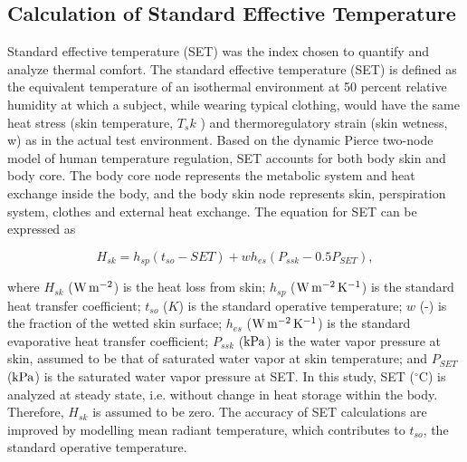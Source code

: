 \documentclass[preprint,3p,12pt,english]{elsarticle}
\begin{document}

\vspace{3ex}

\subsection{Calculation of Standard Effective Temperature}
Standard effective temperature (SET) was the index chosen to quantify and analyze thermal comfort. The standard effective temperature (SET) is defined as the equivalent temperature of an isothermal environment at 50 percent relative humidity at which a subject, while wearing typical clothing, would have the same heat stress (skin temperature, $T_sk$ ) and thermoregulatory strain (skin wetness, w) as in the actual test environment. Based on the dynamic Pierce two-node model of human temperature regulation, SET accounts for both body skin and body core. The body core node represents the metabolic system and heat exchange inside the body, and the body skin node represents skin, perspiration system, clothes and external heat exchange. The equation for SET can be expressed as \cite{gagge1986standard}

\begin{equation}
H_{sk}=h_{sp}(t_{so}-SET)+wh_{es}(P_{ssk}-0.5P_{SET}),
\label{Eqa.SET}
\end{equation}

where $H_{sk}$ ($\rm W\, m^{-2}$) is the heat loss from skin; $h_{sp}$ ($\rm W\, m^{-2}\,K^{-1}$) is the standard heat transfer coefficient; $t_{so}$ ($K$) is the standard operative temperature; $w$ (-) is the fraction of the wetted skin surface; $h_{es}$ ($\rm W\, m^{-2}\,K^{-1}$) is the standard evaporative heat transfer coefficient; $P_{ssk}$ ($\rm kPa$) is the water vapor pressure at skin, assumed to be that of saturated water vapor at skin temperature; and $P_{SET}$ ($\rm kPa$) is the saturated water vapor pressure at SET. In this study, SET ($^{\circ}$C) is analyzed at steady state, i.e. without change in heat storage within the body. Therefore, $H_{sk}$ is assumed to be zero. The accuracy of SET calculations are improved by modelling mean radiant temperature, which contributes to $t_{so}$, the standard operative temperature. 
\end{document}
